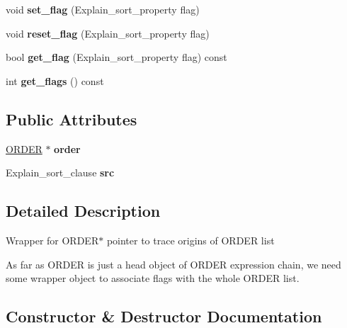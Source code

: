 \begin{DoxyCompactItemize}
\mbox{\label{classJOIN_1_1ORDER__with__src_a80dcf11d85f621e2bae083e3a980cf65}} 
void {\bfseries set\+\_\+flag} (Explain\+\_\+sort\+\_\+property flag)
\item 
\mbox{\label{classJOIN_1_1ORDER__with__src_a722f2945f99c8331eed2c1d7d11d03e3}} 
void {\bfseries reset\+\_\+flag} (Explain\+\_\+sort\+\_\+property flag)
\item 
\mbox{\label{classJOIN_1_1ORDER__with__src_a5640c4434c2f3dd00839e4d281492138}} 
bool {\bfseries get\+\_\+flag} (Explain\+\_\+sort\+\_\+property flag) const
\item 
\mbox{\label{classJOIN_1_1ORDER__with__src_a6334ae44d23f9ab096747439e47ce742}} 
int {\bfseries get\+\_\+flags} () const
\end{DoxyCompactItemize}
\subsection*{Public Attributes}
\begin{DoxyCompactItemize}
\item 
\mbox{\label{classJOIN_1_1ORDER__with__src_a77ff2003cab67d23d00cd4ee8f6091ea}} 
\mbox{\hyperlink{structst__order}{O\+R\+D\+ER}} $\ast$ {\bfseries order}
\item 
\mbox{\label{classJOIN_1_1ORDER__with__src_a437c9c0b0c14ac60e47e74315f612b70}} 
Explain\+\_\+sort\+\_\+clause {\bfseries src}
\end{DoxyCompactItemize}


\subsection{Detailed Description}
Wrapper for O\+R\+D\+E\+R$\ast$ pointer to trace origins of O\+R\+D\+ER list

As far as O\+R\+D\+ER is just a head object of O\+R\+D\+ER expression chain, we need some wrapper object to associate flags with the whole O\+R\+D\+ER list. 

\subsection{Constructor \& Destructor Documentation}
\mbox{\label{classJOIN_1_1ORDER__with__src_a6fce7a1ed37a7f05a46aa76f08f345c6}} 
